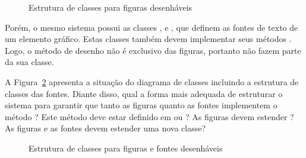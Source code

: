 \begin{figure}[h]
	\centering
	
	
	\caption{Estrutura de classes para figuras desenháveis}
	\label{fig:realizacao-figuras}
\end{figure}

Porém, o mesmo sistema possui as classes ,  e , que definem as fontes de texto de um elemento gráfico. Estas classes também devem implementar seus métodos . Logo, o método de desenho não é exclusivo das figuras, portanto não fazem parte da sua classe.

A Figura~\ref{fig:realizacao-figuras-fontes} apresenta a situação do diagrama de classes incluindo a estrutura de classes das fontes. Diante disso, qual a forma mais adequada de estruturar o sistema para garantir que tanto as figuras quanto as fontes implementem o método ? Este método deve estar definido em  ou ? As figuras devem estender ? As figuras e as fontes devem estender uma nova classe?

\begin{figure}[h]
	\centering
	
	
	\caption{Estrutura de classes para figuras e fontes desenháveis}
	\label{fig:realizacao-figuras-fontes}
\end{figure}

